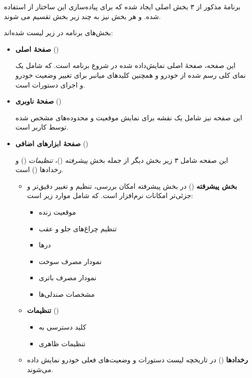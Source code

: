 برنامهٔ مذکور از ۳ بخش اصلی ایجاد شده که برای پیاده‌سازی این ساختار از 
استفاده شده. و هر بخش نیز به چند زیر بخش تقسیم می شوند.

بخش‌های برنامه در زیر لیست شده‌اند:

\begin{itemize}[nosep]
    \item \textbf{صفحهٔ اصلی} ()

    این صفحه، صفحهٔ‌ اصلی نمایش‌داده شده در شروع برنامه است. که شامل یک نمای کلی رسم شده از خودرو و همچنین کلید‌های میانبر برای تغییر وضعیت خودرو و اجرای دستورات است.
    \item \textbf{صفحهٔ ناوبری} ()

    این صفحه نیز شامل یک نقشه برای نمایش موقعیت و محدوده‌های مشخص شده توسط کاربر است.
    \item \textbf{صفحهٔ ابزارهای اضافی} ()

    این صفحه شامل ۳ زیر بخش دیگر از جمله بخش \emph{پیشرفته} ()،
    \emph{تنظیمات} () و رخدادها () است.

    \begin{itemize}[nosep]
        \item \textbf{بخش پیشرفته} ()
        در بخش پیشرفته امکان بررسی، تنظیم و تغییر دقیق‌تر و جزئی‌تر امکانات نرم‌افزار است.
        که شامل موارد زیر است:
        \begin{itemize}[nosep]
            \item موقعیت زنده
            \item تنظیم چراغ‌های جلو و عقب
            \item درها
            \item نمودار مصرف سوخت
            \item نمودار مصرف باتری
            \item مشخصات صندلی‌ها
        \end{itemize}
        \item \textbf{تنظیمات} ()

        \begin{itemize}[nosep]
            \item کلید دسترسی به 
            \item تنظیمات ظاهری
        \end{itemize}
    \item \textbf{رخداد‌ها} ()
    در تاریخچه لیست دستورات و وضعیت‌های فعلی خودرو نمایش داده می‌شوند.
    \end{itemize}
\end{itemize}

